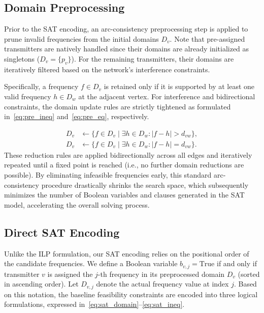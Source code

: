 \documentclass[letterpaper,journal]{IEEEtran}
\begin{document}
\subsection{Domain Preprocessing}
\label{subsec:preprocessing}

Prior to the SAT encoding, an arc-consistency preprocessing step \cite{Aardal2007, Dib2009} is applied to prune invalid frequencies from the initial domains $D_v$. Note that pre-assigned transmitters are natively handled since their domains are already initialized as singletons ($D_v = \{p_v\}$). For the remaining transmitters, their domains are iteratively filtered based on the network's interference constraints.

Specifically, a frequency $f \in D_v$ is retained only if it is supported by at least one valid frequency $h \in D_w$ at the adjacent vertex. For interference and bidirectional constraints, the domain update rules are strictly tightened as formulated in~\eqref{eq:pre_ineq} and~\eqref{eq:pre_eq}, respectively.

\begin{align}
    D_v &\leftarrow \{ f \in D_v \mid \exists h \in D_w : |f - h| > d_{vw} \}, \label{eq:pre_ineq} \\
    D_v &\leftarrow \{ f \in D_v \mid \exists h \in D_w : |f - h| = d_{vw} \}. \label{eq:pre_eq}
\end{align}
These reduction rules are applied bidirectionally across all edges and iteratively repeated until a fixed point is reached (i.e., no further domain reductions are possible). By eliminating infeasible frequencies early, this standard arc-consistency procedure drastically shrinks the search space, which subsequently minimizes the number of Boolean variables and clauses generated in the SAT model, accelerating the overall solving process.

\subsection{Direct SAT Encoding}
\label{subsec:sat_encoding}

Unlike the ILP formulation, our SAT encoding relies on the positional order of the candidate frequencies. We define a Boolean variable $b_{v,j} = \text{True}$ if and only if transmitter $v$ is assigned the $j$-th frequency in its preprocessed domain $D_v$ (sorted in ascending order). Let $D_{v,j}$ denote the actual frequency value at index $j$. Based on this notation, the baseline feasibility constraints are encoded into three logical formulations, expressed in~\eqref{eq:sat_domain}--\eqref{eq:sat_ineq}.
\end{document}
